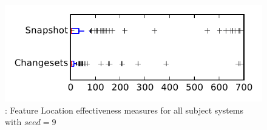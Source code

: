 
\begin{figure}
\centering
\includegraphics[height=0.4\textheight]{figures/flt_seed/rq1_tiny_9}
\caption{\rone: Feature Location effectiveness measures for all subject systems with $seed=9$}
\label{fig:flt_seed:rq1:tiny}
\end{figure}
